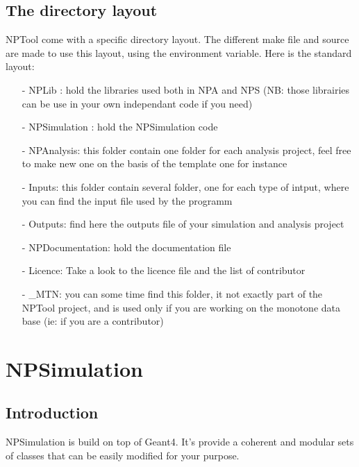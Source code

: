 \documentclass{book}
\begin{document}
				
				
\section{The directory layout}
	NPTool come with a specific directory layout. The different make file and source are made to use this layout, using the environment variable. Here is the standard layout:
		\begin{itemize}
			\item[-] NPLib : hold the libraries used both in NPA and NPS (NB: those librairies can be use in your own independant code if you need)
			\item[-] NPSimulation : hold the NPSimulation code
			\item[-] NPAnalysis: this folder contain one folder for each analysis project, feel free to make new one on the basis of the template one for instance
			\item[-] Inputs: this folder contain several folder, one for each type of intput, where you can find the input file used by the programm
			\item[-] Outputs: find here the outputs file of your simulation and analysis project
			\item[-] NPDocumentation: hold the documentation file
			\item[-] Licence: Take a look to the licence file and the list of contributor
			\item[-] \_MTN: you can some time find this folder, it not exactly part of the NPTool project, and is used only if you are working on the monotone data base (ie: if you are a contributor)
			\item[] 		
		\end{itemize}


				
\chapter[NPSimulation]{NPSimulation}

\section{Introduction}

NPSimulation is build on top of Geant4. It's provide a coherent and modular sets of classes that can be easily modified for your purpose.
\end{document}
